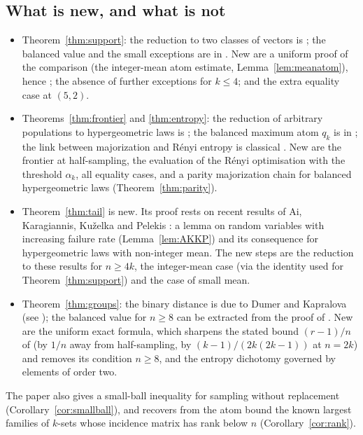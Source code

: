 \documentclass[11pt]{article}
\theoremstyle{remark}
\begin{document}
\subsection{What is new, and what is not}
\begin{itemize}
\item Theorem~\ref{thm:support}: the reduction to two classes of vectors is
\cite[Theorem~1]{MVV}; the balanced value and the small exceptions are in
\cite[Section~5]{MVV}. New are a uniform proof of the comparison (the
integer-mean atom estimate, Lemma~\ref{lem:meanatom}), hence
\cite[Conjecture~1]{MVV}; the absence of further exceptions for \(k\le4\);
and the extra equality case at \((5,2)\).
\item Theorems~\ref{thm:frontier} and \ref{thm:entropy}: the reduction of
arbitrary populations to hypergeometric laws is \cite[Lemma~3]{AKP}; the
balanced maximum atom \(q_k\) is in \cite[Section~5]{MVV}; the link between
majorization and R\'enyi entropy is classical \cite{MWW}. New are the
frontier at half-sampling, the evaluation of the R\'enyi optimisation with the
threshold \(\alpha_k\), all equality cases, and a parity majorization chain
for balanced hypergeometric laws (Theorem~\ref{thm:parity}).
\item Theorem~\ref{thm:tail} is new. Its proof rests on recent results of Ai,
Karagiannis, Ku\v{z}elka and Pelekis \cite{AKKP}: a lemma on random variables
with increasing failure rate (Lemma~\ref{lem:AKKP}) and its consequence
\cite[Theorem~3(1)]{AKKP} for hypergeometric laws with non-integer mean. The
new steps are the reduction to these results for \(n\ge4k\), the
integer-mean case (via the identity used for Theorem~\ref{thm:support}) and the
case of small mean.
\item Theorem~\ref{thm:groups}: the binary distance is due to Dumer and
Kapralova \cite{DK} (see \cite[Theorem~1.2]{BCIM}); the balanced value for
\(n\ge8\) can be extracted from the proof of \cite[Theorem~6.1]{ABSS}. New
are the uniform exact formula, which sharpens the stated bound \((r-1)/n\) of
\cite{ABSS} (by \(1/n\) away from half-sampling, by \((k-1)/(2k(2k-1))\) at
\(n=2k\)) and removes its condition \(n\ge8\), and the entropy
dichotomy governed by elements of order two.
\end{itemize}
The paper also gives a small-ball inequality for sampling without replacement
(Corollary~\ref{cor:smallball}), and recovers from the atom bound the known
largest families of \(k\)-sets whose incidence matrix has rank below \(n\)
(Corollary~\ref{cor:rank}).
\end{document}
